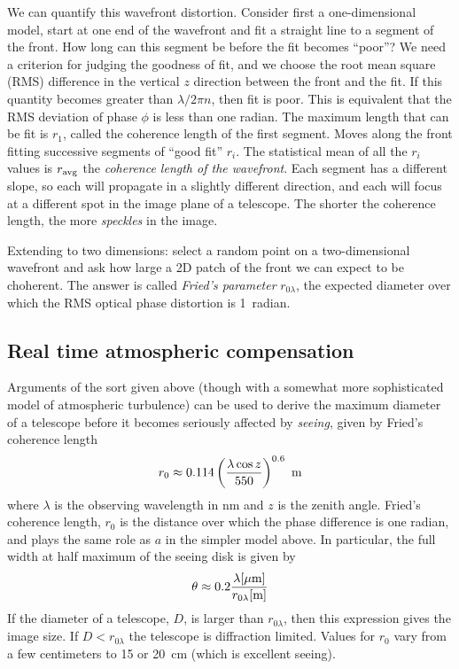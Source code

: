 We can quantify this wavefront distortion. Consider first a
one-dimensional model, start at one end of the wavefront and fit a
straight line to a segment of the front. How long can this segment be
before the fit becomes ``poor''? We need a criterion for judging the
goodness of fit, and we choose the root mean square (RMS) difference in the
vertical $z$ direction between the front and the fit. If this quantity
becomes greater than $\lambda/2\pi n$, then fit is poor. This is
equivalent that the RMS deviation of phase $\phi$ is less than one
radian. The maximum length that can be fit is $r_1$, called the
coherence length of the first segment. Moves along the front
fitting successive segments of ``good fit'' $r_i$. The statistical
mean of all the $r_i$ values is $r_{\rm avg}$ the {\it coherence
  length of the wavefront}. Each segment has a different slope, so
each will propagate in a slightly different direction, and each will
focus at a different spot in the image plane of a telescope. The
shorter the coherence length, the more {\it speckles} in the image.

Extending to two dimensions: select a random point on a
two-dimensional wavefront and ask how large a 2D patch of the front we
can expect to be choherent. The answer is called {\it Fried's
  parameter} $r_{0\lambda}$, the expected diameter over which the RMS
optical phase distortion is 1~radian.

\subsection{Real time atmospheric compensation}

Arguments of the sort given above (though with a somewhat more sophisticated
model of atmospheric turbulence) can be used to derive the maximum diameter
of a telescope before it becomes seriously affected by {\it seeing}, given
by Fried's coherence length 
\[
r_0\approx 0.114\left({\lambda\cos z\over 550}\right)^{0.6}~{\rm m}
\]
where $\lambda$ is the observing wavelength in nm and $z$ is the zenith 
angle. Fried's coherence length, $r_0$ is the distance over which the 
phase difference is one radian, and plays the same role as $a$ in the simpler
model above. In particular, the full width at half maximum of the
seeing disk is given by 
\[
\theta\approx 0.2{\lambda[\mu\mathrm{m}]\over r_{0\lambda}[\mathrm{m}]}
\]
If the diameter of a telescope, $D$, is larger than $r_{0\lambda}$,
then this expression gives the image size. If $D<r_{0\lambda}$ the
telescope is diffraction limited. Values for $r_0$ vary from a few
centimeters to 15 or 20~cm (which is excellent seeing).


